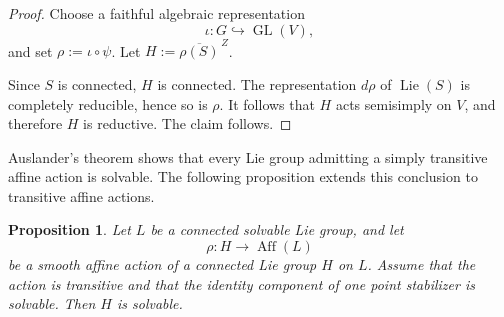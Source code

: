 \documentclass[reqno]{amsart}
\numberwithin{equation}{section}
\newtheorem{proposition}[theorem]{Proposition}
\theoremstyle{definition}
\theoremstyle{remark}
\DeclareMathOperator{\Aff}{Aff}
\DeclareMathOperator{\GL}{GL}
\DeclareMathOperator{\Lie}{Lie}
\begin{document}
\begin{proof}
Choose a faithful algebraic representation
\[
\iota\colon G\hookrightarrow \GL(V),
\]
and set $\rho:=\iota\circ\psi$.
Let $H:=\overline{\rho(S)}^{\,Z}$.

Since $S$ is connected, $H$ is connected.
The representation $d\rho$ of $\Lie(S)$ is completely reducible, hence so is
$\rho$. It follows that $H$ acts semisimply on $V$, and therefore $H$ is
reductive. The claim follows.
\end{proof}

Auslander's theorem \cite{Auslander} shows that every Lie group admitting a
simply transitive affine action is solvable. The following proposition extends
this conclusion to transitive affine actions.

\begin{proposition}\label{prop:affine-general}
Let $L$ be a connected solvable Lie group, and let
\[
\rho\colon H\longrightarrow \Aff(L)
\]
be a smooth affine action of a connected Lie group $H$ on $L$.
Assume that the action is transitive and that the identity component of one
point stabilizer is solvable. Then $H$ is solvable.
\end{proposition}
\end{document}
